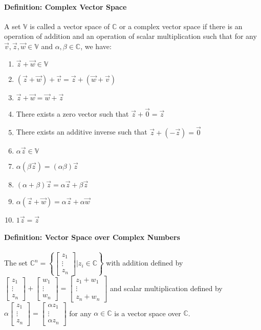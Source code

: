 \documentclass[10pt,letter]{article}
\begin{document}
\paragraph{Definition: Complex Vector Space}
A set $\mathbb{V}$ is called a vector space of $\mathbb{C}$ or a complex vector space if there is an operation of addition and an operation of scalar multiplication such that for any $\vec{v},\vec{z},\vec{w}\in\mathbb{V}$ and $\alpha,\beta\in\mathbb{C}$, we have: \begin{enumerate}
    \item $\vec{z}+\vec{w}\in\mathbb{V}$ 
    \item $(\vec{z}+\vec{w})+\vec{v}=\vec{z}+(\vec{w}+\vec{v})$ 
    \item $\vec{z}+\vec{w}=\vec{w}+\vec{z}$ 
    \item There exists a zero vector such that $\vec{z}+\vec{0}=\vec{z}$ 
    \item There exists an additive inverse such that $\vec{z}+(-\vec{z})=\vec{0}$ 
    \item $\alpha\vec{z}\in\mathbb{V}$ 
    \item $\alpha(\beta\vec{z})=(\alpha\beta)\vec{z}$ 
    \item $(\alpha+\beta)\vec{z}=\alpha\vec{z}+\beta\vec{z}$ 
    \item $\alpha(\vec{z}+\vec{w})=\alpha\vec{z}+\alpha\vec{w}$ 
    \item $1\vec{z}=\vec{z}$
\end{enumerate}

\paragraph{Definition: Vector Space over Complex Numbers}
The set $\mathbb{C}^n=\left\{\begin{bmatrix}z_1\\\vdots\\z_n\end{bmatrix}|z_i\in\mathbb{C}\right\}$ with addition defined by $\begin{bmatrix}z_1\\\vdots\\z_n\end{bmatrix}+\begin{bmatrix}w_1\\\vdots\\w_n\end{bmatrix}=\begin{bmatrix}z_1+w_1\\\vdots\\z_n+w_n\end{bmatrix}$ and scalar multiplication defined by $\alpha\begin{bmatrix}z_1\\\vdots\\z_n\end{bmatrix}=\begin{bmatrix}\alpha z_1\\\vdots\\\alpha z_n\end{bmatrix}$ for any $\alpha\in\mathbb{C}$ is a vector space over $\mathbb{C}$. 
\end{document}
